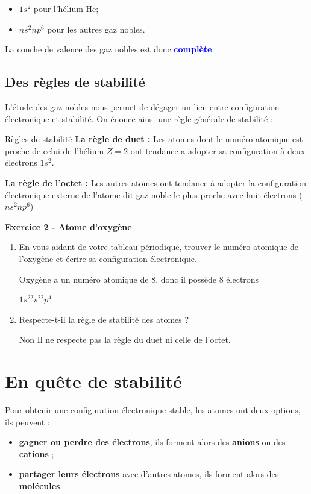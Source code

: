 \documentclass[french, a4paper, 12pt]{article}
\newcommand{\exo}[3]{
	\begin{mdframed}[style=exo, leftmargin=0pt, rightmargin=0pt, innertopmargin=8pt, innerbottommargin=8pt, innerrightmargin=10pt, innerleftmargin=10pt]

		\noindent \textbf{Exercice #1 - #2}\medskip

		#3
	\end{mdframed}
}
\begin{document}
\begin{itemize}
	\item $1s^2$ pour l'hélium He;
	\item  $ns^2np^6$ pour les autres gaz nobles. 
\end{itemize}\medskip

La couche de valence des gaz nobles est donc \textbf{\textcolor{blue}{complète}}.

\subsection{Des règles de stabilité}

L'étude des gaz nobles nous permet de dégager un lien entre configuration
électronique et stabilité. On énonce ainsi une règle générale de stabilité :

\begin{Proposition} {Règles de stabilité}
	\textbf{La règle de duet : } Les atomes dont le numéro atomique est proche de celui de l'hélium $Z=2$ ont tendance a adopter sa configuration à deux électrons $1s^2$.

	\textbf{La règle de l'octet : } Les autres atomes ont tendance à adopter la configuration électronique externe de l'atome dit gaz noble le plus proche avec huit électrons ($ns^2np^6$)
\end{Proposition}

\exo{2}{Atome d'oxygène}{
\begin{enumerate}
	\item En vous aidant de votre tableau périodique, trouver le numéro atomique de l'oxygène et écrire sa configuration électronique.\medskip
	
	Oxygène a un numéro atomique de 8, donc il possède 8 électrons\medskip

	$1s^22s^22p^4$

	\item Respecte-t-il la règle de stabilité des atomes ? \medskip
	
	Non Il ne respecte pas la règle du duet ni celle de l'octet. 
 \end{enumerate}
}
\section{En quête de stabilité}

Pour obtenir une configuration électronique stable, les atomes ont deux options, ils peuvent : 
\begin{itemize}
	\item\textbf{gagner ou perdre des électrons}, ils forment alors des \textbf{anions} ou des \textbf{cations} ;
	\item \textbf{partager leurs électrons} avec d'autres atomes, ils forment alors des \textbf{molécules}.
\end{itemize}
\end{document}
